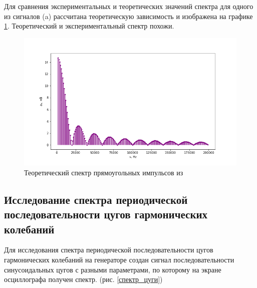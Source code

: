 \documentclass[a4paper,12pt]{article} %
\begin{document}
Для сравнения экспериментальных и теоретических значений спектра для одного из сигналов (a) рассчитана теоретическую зависимость и изображена на графике \ref{теор}. Теоретический и экспериментальный спектр похожи.

\begin{figure}[h!]
\begin{center}
\includegraphics[width=\textwidth]{a(n)}
\caption{Теоретический спектр прямоугольных импульсов из \cite{labnik}} \label{теор}
\end{center}
\end{figure}

\subsection{Исследование спектра периодической последовательности цугов гармонических колебаний}
Для исследования спектра периодической последовательности цугов гармонических колебаний на генераторе создан сигнал последовательности синусоидальных цугов с разными параметрами, по которому на экране осциллографа получен спектр. (рис. \ref{спектр_цуги})
\end{document}
